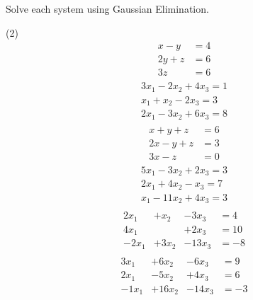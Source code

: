 \documentclass[12pt,fleqn]{book}
\newcommand{\prb}[1]{\begin{Exercise}#1\end{Exercise}}
\begin{document}
\prb{Solve each system using Gaussian Elimination.
\begin{tasks}(2)
	\task \vspace{-2.4em}
		\begin{align*}
		x-y&=4\\
		2y+z&=6\\
		3z&=6
		\end{align*}
	\task \vspace{-2.4em}
		\begin{align*}
		\begin{array}{r}
		3 x_{1}-2 x_{2}+4 x_{3}=1 \\
		x_{1}+x_{2}-2 x_{3}=3 \\
		2 x_{1}-3 x_{2}+6 x_{3}=8
		\end{array}
		\end{align*}
		\vspace{4in}
	\task \vspace{-2.4em}
		\begin{align*}
		x+y+z&=6\\
		2x-y+z&=3\\
		3x-z&=0
		\end{align*}
	\task \vspace{-2.4em}
		\begin{align*}
		\begin{array}{r}
		5 x_{1}-3 x_{2}+2 x_{3}=3 \\
		2 x_{1}+4 x_{2}-x_{3}=7 \\
		x_{1}-11 x_{2}+4 x_{3}=3
		\end{array}
		\end{align*}
		\vspace{4in}
		\task \vspace{-2.4em}
			\begin{align*}
			\begin{array}{rrrr}
				2 x_{1}&+x_{2} & -3x_{3}&=4 \\
				4 x_{1}&       & +2x_{3}&=10 \\
				-2x_{1}&+3x_{2}&-13x_{3}&=-8
			\end{array}
			\end{align*}
			\task \vspace{-2.4em}
				\begin{align*}
				\begin{array}{rrrr}
					3 x_{1}&+ 6x_{2} & -6x_{3}&=9 \\
					2 x_{1}&- 5x_{2} & +4x_{3}&=6 \\
					-1x_{1}&+16x_{2} &-14x_{3}&=-3
				\end{array}
				\end{align*}
\end{tasks}
}
\end{document}
